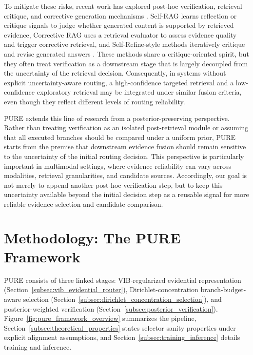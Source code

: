 \documentclass[a4paper,fleqn]{cas-dc}
\begin{document}
To mitigate these risks, recent work has explored post-hoc verification, retrieval critique, and corrective generation mechanisms \citep{Yan2024CorrectiveRAG,Asai2023SelfRAG,Madaan2023SelfRefine}. 
Self-RAG learns reflection or critique signals to judge whether generated content is supported by retrieved evidence, Corrective RAG uses a retrieval evaluator to assess evidence quality and trigger corrective retrieval, and Self-Refine-style methods iteratively critique and revise generated answers \citep{Asai2023SelfRAG,Yan2024CorrectiveRAG,Madaan2023SelfRefine}. 
These methods share a critique-oriented spirit, but they often treat verification as a downstream stage that is largely decoupled from the uncertainty of the retrieval decision. 
Consequently, in systems without explicit uncertainty-aware routing, a high-confidence targeted retrieval and a low-confidence exploratory retrieval may be integrated under similar fusion criteria, even though they reflect different levels of routing reliability.

PURE extends this line of research from a posterior-preserving perspective. Rather than treating verification as an isolated post-retrieval module or assuming that all executed branches should be compared under a uniform prior, PURE starts from the premise that downstream evidence fusion should remain sensitive to the uncertainty of the initial routing decision. This perspective is particularly important in multimodal settings, where evidence reliability can vary across modalities, retrieval granularities, and candidate sources. Accordingly, our goal is not merely to append another post-hoc verification step, but to keep this uncertainty available beyond the initial decision step as a reusable signal for more reliable evidence selection and candidate comparison.

\section{Methodology: The PURE Framework}\label{sec:methodology}
PURE consists of three linked stages: VIB-regularized evidential representation (Section~\ref{subsec:vib_evidential_router}), Dirichlet-concentration branch-budget-aware selection (Section~\ref{subsec:dirichlet_concentration_selection}), and posterior-weighted verification (Section~\ref{subsec:posterior_verification}). 
Figure~\ref{fig:pure_framework_overview} summarizes the pipeline, Section~\ref{subsec:theoretical_properties} states selector sanity properties under explicit alignment assumptions, and Section~\ref{subsec:training_inference} details training and inference.
\end{document}
